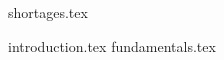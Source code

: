 \documentclass[runningheads]{llncs}
\begin{document}

\newpage

{shortages.tex}

\newpage

{introduction.tex}
{fundamentals.tex}


\newpage

\printbibliography

\end{document}
